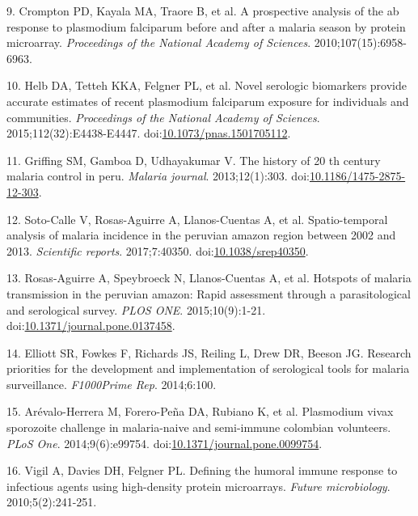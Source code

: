 \documentclass[]{article}
\begin{document}
\hypertarget{ref-crompton2010}{}
9. Crompton PD, Kayala MA, Traore B, et al. A prospective analysis of
the ab response to plasmodium falciparum before and after a malaria
season by protein microarray. \emph{Proceedings of the National Academy
of Sciences}. 2010;107(15):6958-6963.

\hypertarget{ref-Helb2015exposure}{}
10. Helb DA, Tetteh KKA, Felgner PL, et al. Novel serologic biomarkers
provide accurate estimates of recent plasmodium falciparum exposure for
individuals and communities. \emph{Proceedings of the National Academy
of Sciences}. 2015;112(32):E4438-E4447.
doi:\href{https://doi.org/10.1073/pnas.1501705112}{10.1073/pnas.1501705112}.

\hypertarget{ref-griffing2013history}{}
11. Griffing SM, Gamboa D, Udhayakumar V. The history of 20 th century
malaria control in peru. \emph{Malaria journal}. 2013;12(1):303.
doi:\href{https://doi.org/10.1186/1475-2875-12-303}{10.1186/1475-2875-12-303}.

\hypertarget{ref-soto2017spatio}{}
12. Soto-Calle V, Rosas-Aguirre A, Llanos-Cuentas A, et al.
Spatio-temporal analysis of malaria incidence in the peruvian amazon
region between 2002 and 2013. \emph{Scientific reports}. 2017;7:40350.
doi:\href{https://doi.org/10.1038/srep40350}{10.1038/srep40350}.

\hypertarget{ref-hotspots2015}{}
13. Rosas-Aguirre A, Speybroeck N, Llanos-Cuentas A, et al. Hotspots of
malaria transmission in the peruvian amazon: Rapid assessment through a
parasitological and serological survey. \emph{PLOS ONE}.
2015;10(9):1-21.
doi:\href{https://doi.org/10.1371/journal.pone.0137458}{10.1371/journal.pone.0137458}.

\hypertarget{ref-elliott2014}{}
14. Elliott SR, Fowkes F, Richards JS, Reiling L, Drew DR, Beeson JG.
Research priorities for the development and implementation of
serological tools for malaria surveillance. \emph{F1000Prime Rep}.
2014;6:100.

\hypertarget{ref-arevalo2014}{}
15. Arévalo-Herrera M, Forero-Peña DA, Rubiano K, et al. Plasmodium
vivax sporozoite challenge in malaria-naive and semi-immune colombian
volunteers. \emph{PLoS One}. 2014;9(6):e99754.
doi:\href{https://doi.org/10.1371/journal.pone.0099754}{10.1371/journal.pone.0099754}.

\hypertarget{ref-vigil2010}{}
16. Vigil A, Davies DH, Felgner PL. Defining the humoral immune response
to infectious agents using high-density protein microarrays.
\emph{Future microbiology}. 2010;5(2):241-251.
\end{document}
